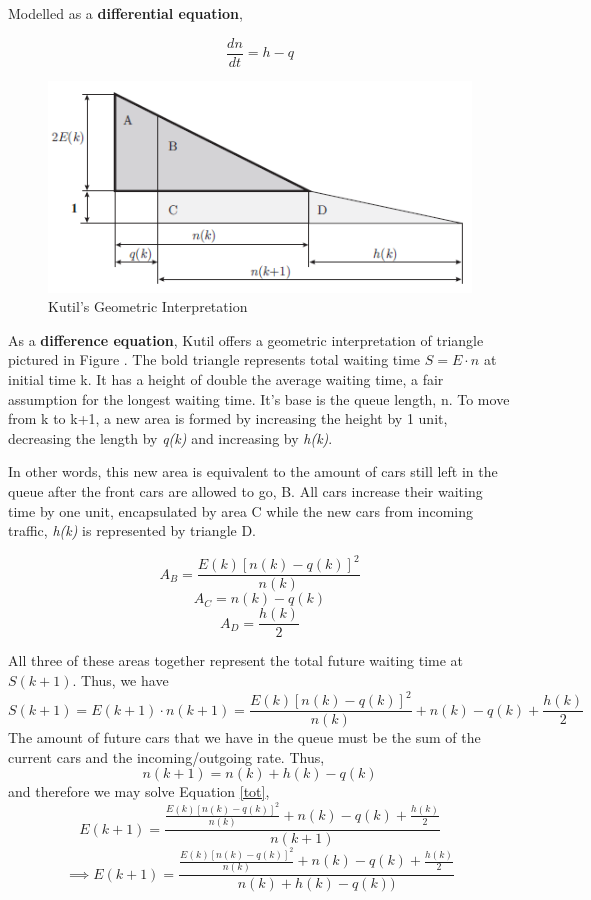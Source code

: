 \documentclass[a4paper]{article}
\begin{document}
Modelled as a \textbf{differential equation},

\[\frac{dn}{dt} =  h - q\]

\begin{figure}
\centering
\includegraphics[scale=1]{geo.png}
\caption{Kutil's Geometric Interpretation}
\end{figure}
As a \textbf{difference equation}, Kutil offers a geometric interpretation of triangle pictured in Figure . The bold triangle represents total waiting time $S = E \cdot n$ at initial time k. It has a height of double the average waiting time, a fair assumption for the longest waiting time. It's base is the queue length, n. To move from k to k+1, a new area is formed by increasing the height by 1 unit, decreasing the length by \textit{q(k)} and increasing by \textit{h(k)}. 

In other words, this new area is equivalent to the amount of cars still left in the queue after the front cars are allowed to go, B. All cars increase their waiting time by one unit, encapsulated by area C while the new cars from incoming traffic, \textit{h(k)} is represented by triangle D. 

\[A_B = \frac{E(k) [n(k)-q(k)]^2}{n(k)}\]
\[A_C = n(k) -q(k)\]
\[A_D = \frac{h(k)}{2}\]


All three of these areas together represent the total future waiting time at $S(k+1)$. Thus, we have 
\begin{equation}
S(k+1) = E(k+1) \cdot n(k+1) = \frac{E(k) [n(k)-q(k)]^2}{n(k)} + n(k) -q(k)+ \frac{h(k)}{2}
\label{tot}
\end{equation}
The amount of future cars that we have in the queue must be the sum of the current cars and the incoming/outgoing rate. Thus,
\begin{equation}
n(k+1) = n(k) +h (k) -q(k)
\label{car}
\end{equation}
and therefore we may solve Equation \ref{tot},
\[E(k+1) = \frac{\frac{E(k) [n(k)-q(k)]^2}{n(k)} + n(k) -q(k)+ \frac{h(k)}{2}}{n(k+1)}\]
\begin{equation}
\implies E(k+1) = \frac{\frac{E(k) [n(k)-q(k)]^2}{n(k)} + n(k) -q(k)+ \frac{h(k)}{2}}{n(k) +h (k) -q(k))} 
\label{wait}
\end{equation}
\end{document}
